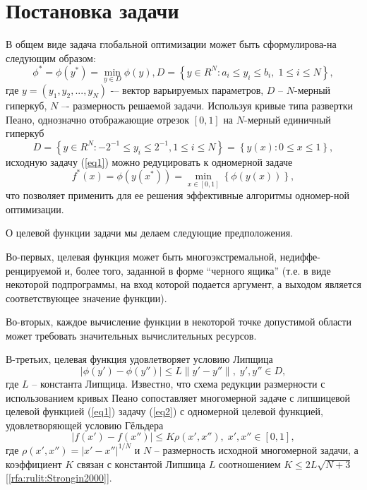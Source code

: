 \documentclass[10pt,a4paper]{book}
\begin{document}
\section{Постановка задачи}
В общем виде задача глобальной оптимизации может быть сформулирова-на следующим образом:
\begin{equation}\label{eq1} 
\phi^*=\phi(y^* )=\min_{y \in D} \phi(y), D=\left\{ y \in R^N: a_i \leq y_i \leq b_i, \; 1 \leq i \leq N \right\},
\end{equation}
где $y=(y_1,y_2,...,y_N)$ -– вектор варьируемых параметров, $D$ -- $N$-мерный гиперкуб, $N$ –- размерность решаемой задачи.
Используя кривые типа развертки Пеано, однозначно отображающие отрезок $[0,1]$ на $N$-мерный единичный гиперкуб
$$
D=\left\{ y \in R^N: -2^{-1} \leq y_i \leq 2^{-1}, 1 \leq i \leq N \right\} = \left\{ y(x): 0 \leq x \leq 1 \right\},
$$
исходную задачу (\ref{eq1}) можно редуцировать к одномерной задаче
\begin{equation}\label{eq2} 
f^*(x)=\phi(y(x^* ))=\min_{x \in [0,1]} \left\{ \phi(y(x)) \right\},
\end{equation}
что позволяет применить для ее решения эффективные алгоритмы одномер-ной оптимизации.

О целевой функции задачи мы делаем следующие предположения. 

Во-первых, целевая функция может быть многоэкстремальной, недиффе-ренцируемой и, более того, заданной в форме ``черного ящика'' (т.е. в виде некоторой подпрограммы, на вход которой подается аргумент, а выходом является соответствующее значение функции).

Во-вторых, каждое вычисление функции в некоторой точке допустимой области может требовать значительных вычислительных ресурсов.

В-третьих, целевая функция удовлетворяет условию Липщица
\begin{equation}\label{eq3} 
| \phi (y')-\phi (y'') | \leq L \| y'-y'' \|, \; y',y'' \in D,
\end{equation}
где $L$ -- константа Липщица. Известно, что схема редукции размерности с использованием кривых Пеано сопоставляет многомерной задаче с липшицевой целевой функцией (\ref{eq1}) задачу (\ref{eq2}) с одномерной целевой функцией, удовлетворяющей условию Гёльдера
\begin{equation}\label{eq4} 
| f(x')-f(x'') | \leq K \rho(x',x''), \; x',x'' \in [0,1],
\end{equation}
где $\rho(x',x'') =  |x' - x''|^{1/N}$ и $N$ -- размерность исходной многомерной задачи, а коэффициент $K$ связан с константой Липшица $L$ соотношением $K \leq 2L\sqrt {N+3}$ [\ref{rfa:rulit:Strongin2000}].
\end{document}
